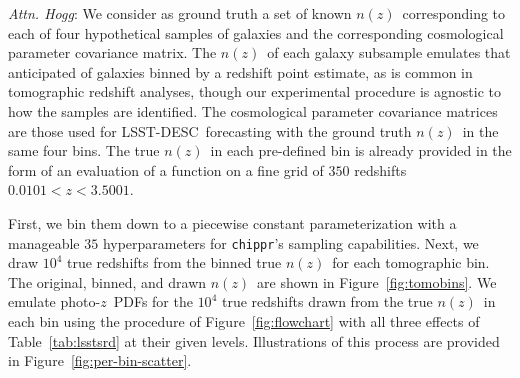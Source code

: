 \documentclass[iop]{emulateapj}
\newcommand{\todo}[3]{{\color{#2}\emph{#1}: #3}}
\newcommand{\dwh}[1]{\todo{Attn. Hogg}{blue}{#1}}
\newcommand{\Fig}[1]{Figure~\ref{#1}}
\newcommand{\project}[1]{\textsc{#1}}
\newcommand{\lsst}{\project{LSST}}
\newcommand{\desc}{\lsst-\project{DESC}}
\newcommand{\repo}[1]{\texttt{#1}}
\newcommand{\chippr}{\repo{chippr}}
\newcommand{\pz}{photo-$z$}
\newcommand{\pzpdf}{\pz\ PDF}%
\newcommand{\nz}{$n(z)$}
\begin{document}
\dwh{We consider as ground truth a set of known \nz\ corresponding to each of four hypothetical samples of galaxies and the corresponding cosmological parameter covariance matrix.
The \nz\ of each galaxy subsample emulates that anticipated of galaxies binned by a redshift point estimate, as is common in tomographic redshift analyses, though our experimental procedure is agnostic to how the samples are identified.
The cosmological parameter covariance matrices are those used for \desc\ forecasting with the ground truth \nz\ in the same four bins.}
The true \nz\ in each pre-defined bin is already provided in the form of an evaluation of a function on a fine grid of $350$ redshifts $0.0101 < z < 3.5001$.

First, we bin them down to a piecewise constant parameterization with a manageable $35$ hyperparameters for \chippr's sampling capabilities.
Next, we draw $10^{4}$ true redshifts from the binned true \nz\ for each tomographic bin.
The original, binned, and drawn \nz\ are shown in \Fig{fig:tomobins}.
We emulate \pzpdf s for the $10^{4}$ true redshifts drawn from the true \nz\ in each bin using the procedure of \Fig{fig:flowchart} with all three effects of Table~\ref{tab:lsstsrd}
at their given levels.
Illustrations of this process are provided in \Fig{fig:per-bin-scatter}.
\end{document}
